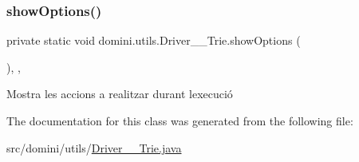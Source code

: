 \mbox{\label{classdomini_1_1utils_1_1Driver____Trie_a8b61698744500c2c6ffa92f861162ff5}} 
\subsubsection{\texorpdfstring{show\+Options()}{showOptions()}}
{\footnotesize\ttfamily private static void domini.\+utils.\+Driver\+\_\+\+\_\+\+Trie.\+show\+Options (\begin{DoxyParamCaption}{ }\end{DoxyParamCaption})\hspace{0.3cm}{\ttfamily [inline]}, {\ttfamily [static]}, {\ttfamily [private]}}



Mostra les accions a realitzar durant l\textquotesingle{}execució 



The documentation for this class was generated from the following file\+:\begin{DoxyCompactItemize}
\item 
src/domini/utils/\hyperlink{Driver____Trie_8java}{Driver\+\_\+\+\_\+\+Trie.\+java}\end{DoxyCompactItemize}
